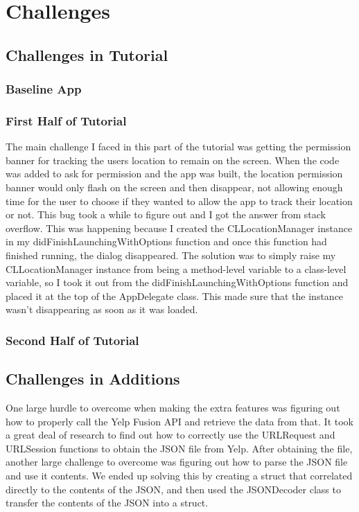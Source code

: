 \documentclass[conference]{IEEEtran}
\begin{document}
\section{Challenges}

\subsection{Challenges in Tutorial}
\subsubsection{Baseline App}
\subsubsection{First Half of Tutorial}
The main challenge I faced in this part of the tutorial was getting the permission banner for tracking the users location to remain on the screen. When the code was added to ask for permission and the app was built, the location permission banner would only flash on the screen and then disappear, not allowing enough time for the user to choose if they wanted to allow the app to track their location or not. This bug took a while to figure out and I got the answer from stack overflow. This was happening because I created the CLLocationManager instance in my didFinishLaunchingWithOptions function and once this function had finished running, the dialog disappeared. The solution was to simply raise my CLLocationManager instance from being a method-level variable to a class-level variable, so I took it out from the  didFinishLaunchingWithOptions function and placed it at the top of the AppDelegate class. This made sure that the instance wasn't disappearing as soon as it was loaded. 
\subsubsection{Second Half of Tutorial}


\subsection{Challenges in Additions}
One large hurdle to overcome when making the extra features was figuring out how
to properly call the Yelp Fusion API and retrieve the data from that. It took a 
great deal of research to find out how to correctly use the URLRequest and URLSession
functions to obtain the JSON file from Yelp. After obtaining the file, another large
challenge to overcome was figuring out how to parse the JSON file and use it contents.
We ended up solving this by creating a struct that correlated directly to the contents
of the JSON, and then used the JSONDecoder class to transfer the contents of the 
JSON into a struct.
\end{document}
